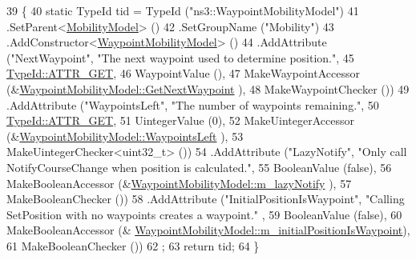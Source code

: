 \begin{DoxyCode}
39 \{
40   \textcolor{keyword}{static} TypeId tid = TypeId (\textcolor{stringliteral}{"ns3::WaypointMobilityModel"})
41     .SetParent<\hyperlink{classns3_1_1MobilityModel_af61ca3dbc723d8109d115fb081fd0299}{MobilityModel}> ()
42     .SetGroupName (\textcolor{stringliteral}{"Mobility"})
43     .AddConstructor<\hyperlink{classns3_1_1WaypointMobilityModel_a7963902c3bb7e2ad6ce2729a9f93ca70}{WaypointMobilityModel}> ()
44     .AddAttribute (\textcolor{stringliteral}{"NextWaypoint"}, \textcolor{stringliteral}{"The next waypoint used to determine position."},
45                    \hyperlink{classns3_1_1TypeId_a3ab7b43b95f96391c514d609ca60e542a3dd4b476c9b257285c177d6c414b5fd0}{TypeId::ATTR\_GET},
46                    WaypointValue (),
47                    MakeWaypointAccessor (&\hyperlink{classns3_1_1WaypointMobilityModel_a44772fb2eca36fdcbdd886881dee85d9}{WaypointMobilityModel::GetNextWaypoint}
      ),
48                    MakeWaypointChecker ())
49     .AddAttribute (\textcolor{stringliteral}{"WaypointsLeft"}, \textcolor{stringliteral}{"The number of waypoints remaining."},
50                    \hyperlink{classns3_1_1TypeId_a3ab7b43b95f96391c514d609ca60e542a3dd4b476c9b257285c177d6c414b5fd0}{TypeId::ATTR\_GET},
51                    UintegerValue (0),
52                    MakeUintegerAccessor (&\hyperlink{classns3_1_1WaypointMobilityModel_a3ac831dc6e3fe7ad04a61c91db52447a}{WaypointMobilityModel::WaypointsLeft}
      ),
53                    MakeUintegerChecker<uint32\_t> ())
54     .AddAttribute (\textcolor{stringliteral}{"LazyNotify"}, \textcolor{stringliteral}{"Only call NotifyCourseChange when position is calculated."},
55                    BooleanValue (\textcolor{keyword}{false}),
56                    MakeBooleanAccessor (&\hyperlink{classns3_1_1WaypointMobilityModel_a8da394b74b52cf59fbee7372167e6a45}{WaypointMobilityModel::m\_lazyNotify}
      ),
57                    MakeBooleanChecker ())
58     .AddAttribute (\textcolor{stringliteral}{"InitialPositionIsWaypoint"}, \textcolor{stringliteral}{"Calling SetPosition with no waypoints creates a waypoint."}
      ,
59                    BooleanValue (\textcolor{keyword}{false}),
60                    MakeBooleanAccessor (&
      \hyperlink{classns3_1_1WaypointMobilityModel_a3db9542bf052bb86a2e335661016f352}{WaypointMobilityModel::m\_initialPositionIsWaypoint}),
61                    MakeBooleanChecker ())
62   ;
63   \textcolor{keywordflow}{return} tid;
64 \}
\end{DoxyCode}


